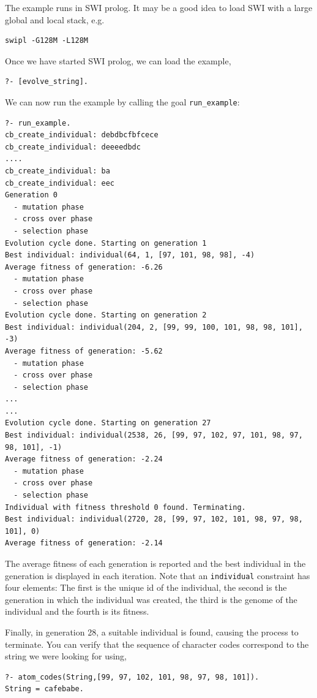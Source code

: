 \documentclass{article}
\begin{document}
The example runs in SWI prolog. It may be a good idea to load SWI with a large global and local stack, e.g. 
\begin{verbatim}
swipl -G128M -L128M
\end{verbatim}

\noindent
Once we have started SWI prolog, we can load the example, 
\begin{verbatim}
?- [evolve_string].
\end{verbatim}

\noindent
We can now run the example by calling the goal \verb|run_example|:

\begin{verbatim}
?- run_example.
cb_create_individual: debdbcfbfcece
cb_create_individual: deeeedbdc
....
cb_create_individual: ba
cb_create_individual: eec
Generation 0
  - mutation phase
  - cross over phase
  - selection phase
Evolution cycle done. Starting on generation 1
Best individual: individual(64, 1, [97, 101, 98, 98], -4)
Average fitness of generation: -6.26
  - mutation phase
  - cross over phase
  - selection phase
Evolution cycle done. Starting on generation 2
Best individual: individual(204, 2, [99, 99, 100, 101, 98, 98, 101], -3)
Average fitness of generation: -5.62
  - mutation phase
  - cross over phase
  - selection phase
...
...
Evolution cycle done. Starting on generation 27
Best individual: individual(2538, 26, [99, 97, 102, 97, 101, 98, 97, 98, 101], -1)
Average fitness of generation: -2.24
  - mutation phase
  - cross over phase
  - selection phase
Individual with fitness threshold 0 found. Terminating.
Best individual: individual(2720, 28, [99, 97, 102, 101, 98, 97, 98, 101], 0)
Average fitness of generation: -2.14
\end{verbatim}

The average fitness of each generation is reported and the best individual in the generation is displayed in each iteration. Note that an \verb|individual| constraint
has four elements: The first is the unique id of the individual, the second is the generation in which the individual was created, the third is the genome of the individual
and the fourth is its fitness.

Finally, in generation 28, a suitable individual is found, causing the process to terminate. You can verify that the sequence of character codes correspond to the string we were looking for using, 

\begin{verbatim}
?- atom_codes(String,[99, 97, 102, 101, 98, 97, 98, 101]).
String = cafebabe.
\end{verbatim}
\end{document}
